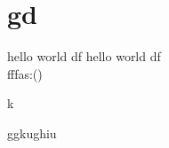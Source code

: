\documentclass{article}
\begin{document}
\section{gd}
	hello world df \textbf{\gitRel}
	hello world df \textbf{\gitRel}\\
	fffas:\gitRoff(\gitCommitterDate)\\
	\newpage
	\begin{changelog}[author=Michele]
		\begin{version}[version=1.20]
			\added
			\item k
		\end{version}
		\begin{version}[version=\gitReln]
		\added
		\item ggkughiu
	\end{version}
	\end{changelog}
\end{document}
